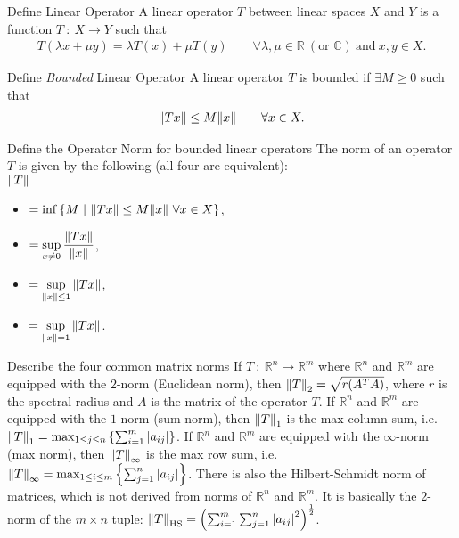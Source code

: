\documentclass[avery5388,grid,frame]{flashcards}
\def\Rl{\mathbb{R}}
\def\Cx{\mathbb{C}}
\begin{document}
\begin{flashcard}
    {Define Linear Operator}
    A linear operator $T$ between linear spaces $X$ and $Y$ is a function $T\ :\ X \rightarrow Y$ such that
    \begin{align*}
        T(\lambda x + \mu y) = \lambda T(x) + \mu T(y) \qquad \forall \lambda,\mu \in \Rl\ (\text{or } \Cx)\ \text{and}\ x,y \in X.
    \end{align*}
\end{flashcard}

\begin{flashcard}
    {Define \emph{Bounded} Linear Operator}
    A linear operator $T$ is bounded if $\exists M \geq 0$ such that
    \begin{align*}
        \norm{Tx} \leq M\norm{x} \qquad \forall x \in X.
    \end{align*}
\end{flashcard}

\begin{flashcard}
    {Define the Operator Norm for bounded linear operators}
    The norm of an operator $T$ is given by the following (all four are equivalent): \\

    $\norm{T}$
    \begin{itemize}
        \item[] $= \inf\left\{M\ |\ \norm{Tx} \leq M\norm{x}\ \forall x \in X\right\}$,
        \item[] $\displaystyle= \sup_{x\neq 0}\dfrac{\norm{Tx}}{\norm{x}}$,
        \item[] $\displaystyle= \sup_{\norm{x} \leq 1} \norm{Tx}$,
        \item[] $\displaystyle= \sup_{\norm{x} = 1} \norm{Tx}$.
    \end{itemize}
\end{flashcard}

\begin{flashcard}
    {Describe the four common matrix norms}
    If $T\ :\ \Rl^n \rightarrow \Rl^m$ where $\Rl^n$ and $\Rl^m$ are equipped with the $2$-norm (Euclidean norm), then $\norm{T}_2 = \sqrt{r(A^TA)}$, where $r$ is the spectral radius and $A$ is the matrix of the operator $T$.  If $\Rl^n$ and $\Rl^m$ are equipped with the $1$-norm (sum norm), then $\norm{T}_1$ is the max column sum, i.e. $\norm{T}_1 = \max_{1 \leq j \leq n} \left\{\sum_{i=1}^m \abs{a_{ij}}\right\}$.  If $\Rl^n$ and $\Rl^m$ are equipped with the $\infty$-norm (max norm), then $\norm{T}_\infty$ is the max row sum, i.e. $\norm{T}_\infty = \max_{1 \leq i \leq m} \left\{\sum_{j=1}^n \abs{a_{ij}}\right\}$.  There is also the Hilbert-Schmidt norm of matrices, which is not derived from norms of $\Rl^n$ and $\Rl^m$.  It is basically the $2$-norm of the $m\times n$ tuple: $\norm{T}_{\text{HS}} = \qty(\sum_{i=1}^m\sum_{j=1}^n \abs{a_{ij}}^2)^{\frac{1}{2}}$.
\end{flashcard}
\end{document}
